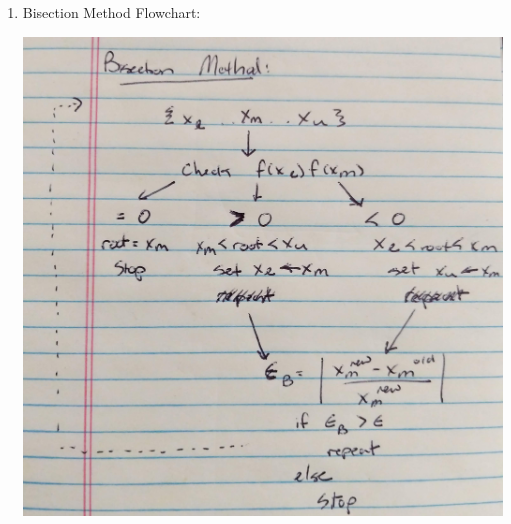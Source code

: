 \documentclass[12pt]{extarticle}
\begin{document}
\begin{enumerate}
\item Bisection Method Flowchart:
\begin{center}
\includegraphics[width = .6\textwidth]{pic_3}
\end{center}
\end{enumerate}

\newpage
\end{document}
